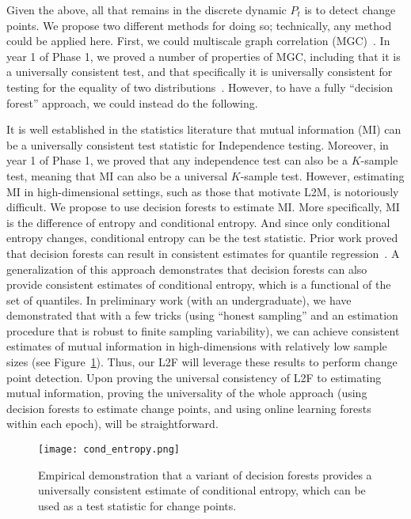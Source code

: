 \documentclass{article}
\begin{document}
Given the above, all that remains in the discrete dynamic $P_t$ is to detect change points. We propose two different methods for doing so; technically, any method could be applied here. First, we could multiscale graph correlation (MGC)~\cite{Shen2016-fo, Shen2017-ub}.  In year 1 of Phase 1, we proved a number of properties of MGC, including that it is a universally consistent test, and that specifically it is universally consistent for testing for the equality of two distributions~\cite{Shen2018-st}.  However, to have a fully ``decision forest'' approach, we could instead do the following. 

It is well established in the statistics literature that mutual information (MI) can be a universally consistent test statistic for Independence testing.  Moreover, in year 1 of Phase 1, we proved that any independence test can also be a $K$-sample test, meaning that MI can also be a universal $K$-sample test. However, estimating MI in high-dimensional settings, such as those that motivate L2M, is notoriously difficult.  We propose to use decision forests to estimate MI.  More specifically,  MI is the difference of entropy and conditional entropy.  And since only conditional entropy changes, conditional entropy can be the test statistic.  Prior work proved that decision forests can result in consistent estimates for quantile regression~\cite{Meinshausen2006-kw}.  A generalization of this approach demonstrates that decision forests can also provide consistent estimates of conditional entropy, which is a functional of the set of quantiles.  In preliminary work (with an undergraduate), we have demonstrated that with a few tricks (using ``honest sampling'' and an estimation procedure that is robust to finite sampling variability), we can achieve consistent estimates of mutual information in high-dimensions with relatively low sample sizes (see Figure~\ref{fig:cond_entropy}). Thus, our L2F will leverage these results to perform change point detection. Upon proving the universal consistency of L2F to estimating mutual information, proving the universality of the whole approach (using decision forests to estimate change points, and using online learning forests within each epoch), will be straightforward. 

\begin{figure}
    \centering
    \texttt{[image: cond\_entropy.png]}
    \caption{Empirical demonstration that a variant of decision forests provides a universally consistent estimate of conditional entropy, which can be used as a test statistic for change points.}
    \label{fig:cond_entropy}
\end{figure}
\end{document}
